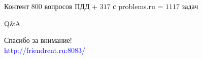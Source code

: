 \documentclass[fullscreen, unicode, bookmarks = false]{beamer}
\begin{document}
\begin{frame}{Контент}
	    $800$ вопросов ПДД + $317$ с problems.ru = $1117$ задач        
    \end{frame}
     
    
	

    \begin{frame} {Q\&A}
		\begin{center}
        	Спасибо за внимание!\\
        	\textcolor{blue}{http://friendrent.ru:8083/}
		\end{center}
    \end{frame}
\end{document}
